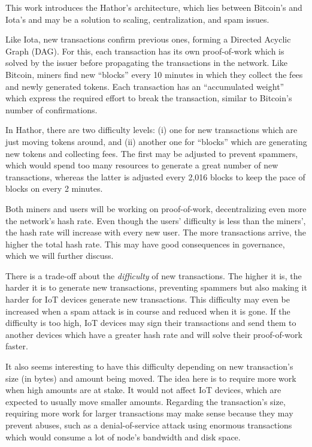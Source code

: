 
This work introduces the Hathor's architecture, which lies between Bitcoin's and Iota's and may be a solution to scaling, centralization, and spam issues.

Like Iota, new transactions confirm previous ones, forming a Directed Acyclic Graph (DAG). For this, each transaction has its own proof-of-work which is solved by the issuer before propagating the transactions in the network. Like Bitcoin, miners find new ``blocks'' every 10 minutes in which they collect the fees and newly generated tokens. Each transaction has an ``accumulated weight'' which express the required effort to break the transaction, similar to Bitcoin's number of confirmations.

In Hathor, there are two difficulty levels: (i) one for new transactions which are just moving tokens around, and (ii) another one for ``blocks'' which are generating new tokens and collecting fees. The first may be adjusted to prevent spammers, which would spend too many resources to generate a great number of new transactions, whereas the latter is adjusted every 2,016 blocks to keep the pace of blocks on every 2 minutes.

Both miners and users will be working on proof-of-work, decentralizing even more the network's hash rate. Even though the users' difficulty is less than the miners', the hash rate will increase with every new user. The more transactions arrive, the higher the total hash rate. This may have good consequences in governance, which we will further discuss.

There is a trade-off about the \textit{difficulty} of new transactions. The higher it is, the harder it is to generate new transactions, preventing spammers but also making it harder for IoT devices generate new transactions. This difficulty may even be increased when a spam attack is in course and reduced when it is gone. If the difficulty is too high, IoT devices may sign their transactions and send them to another devices which have a greater hash rate and will solve their proof-of-work faster.

It also seems interesting to have this difficulty depending on new transaction's size (in bytes) and amount being moved. The idea here is to require more work when high amounts are at stake. It would not affect IoT devices, which are expected to usually move smaller amounts. Regarding the transaction's size, requiring more work for larger transactions may make sense because they may prevent abuses, such as a denial-of-service attack using enormous transactions which would consume a lot of node's bandwidth and disk space.

